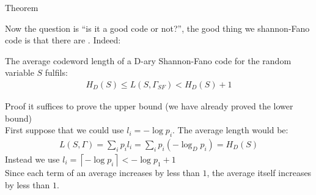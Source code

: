 \begin{parag}{Theorem}
    
    Now the question is ``is it a good code or not?'', the good thing we shannon-Fano code is that there are . Indeed:
    \begin{theoreme}
        The average codeword length of a D-ary Shannon-Fano code for the random variable $S$ fulfils: 
        \begin{align*}
            H_D(S) \leq L(S, \Gamma_{SF}) < H_D(S) + 1
        \end{align*}
        
    \end{theoreme}
   \begin{subparag}{Proof}
       it suffices to prove the upper bound (we have already proved the lower bound) 
       \\
       First suppose that we could use $l_i = -\log p_i$. The average length would be:
       \begin{align*}
           L(S, \Gamma) = \sum_i p_i l_i = \sum_i p_i (-\log_D p_i) = H_D(S)
       \end{align*}
       Instead we use $l_i = \left\lceil -\log p_i \right \rceil < - \log p_1 + 1 $\\
       Since each term of an average increases by less than $1$, the average itself increases by less than $1$.
       
   \end{subparag} 

\end{parag}

